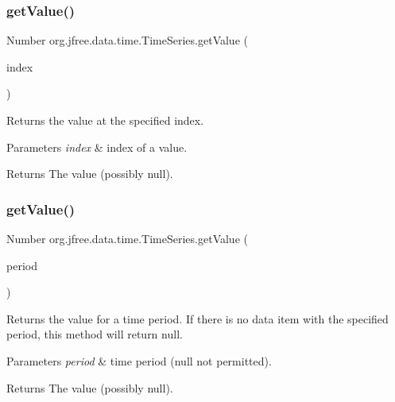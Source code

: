 \subsubsection{\texorpdfstring{get\+Value()}{getValue()}\hspace{0.1cm}{\footnotesize\ttfamily [1/2]}}
{\footnotesize\ttfamily Number org.\+jfree.\+data.\+time.\+Time\+Series.\+get\+Value (\begin{DoxyParamCaption}\item[{int}]{index }\end{DoxyParamCaption})}

Returns the value at the specified index.


\begin{DoxyParams}{Parameters}
{\em index} & index of a value.\\
\hline
\end{DoxyParams}
\begin{DoxyReturn}{Returns}
The value (possibly {\ttfamily null}). 
\end{DoxyReturn}
\mbox{\label{classorg_1_1jfree_1_1data_1_1time_1_1_time_series_a5be1cb0fb4c9ca7d8efff148e6450436}} 
\subsubsection{\texorpdfstring{get\+Value()}{getValue()}\hspace{0.1cm}{\footnotesize\ttfamily [2/2]}}
{\footnotesize\ttfamily Number org.\+jfree.\+data.\+time.\+Time\+Series.\+get\+Value (\begin{DoxyParamCaption}\item[{\mbox{\hyperlink{classorg_1_1jfree_1_1data_1_1time_1_1_regular_time_period}{Regular\+Time\+Period}}}]{period }\end{DoxyParamCaption})}

Returns the value for a time period. If there is no data item with the specified period, this method will return {\ttfamily null}.


\begin{DoxyParams}{Parameters}
{\em period} & time period ({\ttfamily null} not permitted).\\
\hline
\end{DoxyParams}
\begin{DoxyReturn}{Returns}
The value (possibly {\ttfamily null}). 
\end{DoxyReturn}
\mbox{\label{classorg_1_1jfree_1_1data_1_1time_1_1_time_series_a3068fa73bcead27777ac0440ce45c95a}} 
